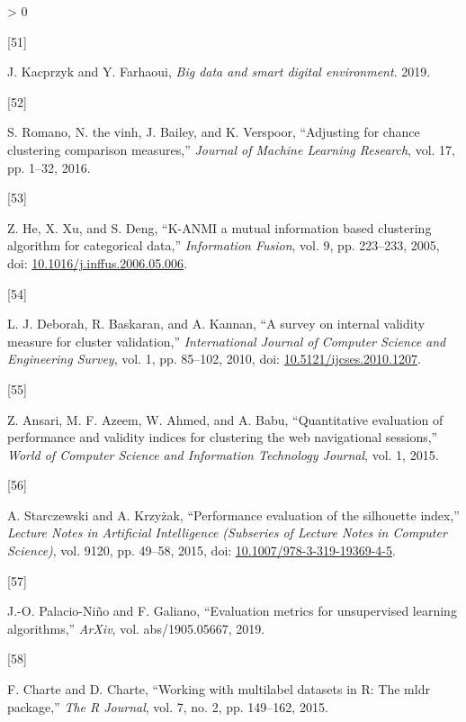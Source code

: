 \documentclass[
]{article}
\newlength{\cslhangindent}
\newlength{\csllabelwidth}
\newenvironment{CSLReferences}[3] %
 {%
  \setlength{\parindent}{0pt}
  \ifodd #1 \everypar{\setlength{\hangindent}{\cslhangindent}}\ignorespaces\fi
  \ifnum #2 > 0
  \setlength{\parskip}{#2\baselineskip}
  \fi
 }%
 {}
\newcommand{\CSLLeftMargin}[1]{\parbox[t]{\csllabelwidth}{#1}}
\newcommand{\CSLRightInline}[1]{\parbox[t]{\linewidth - \csllabelwidth}{#1}}
\begin{document}
\begin{CSLReferences}{0}{0}
\leavevmode\hypertarget{ref-Rjanuszyousef2019}{}%
\CSLLeftMargin{{[}51{]} }
\CSLRightInline{J. Kacprzyk and Y. Farhaoui, \emph{Big data and smart
digital environment}. 2019.}

\leavevmode\hypertarget{ref-Rsimonenguyenjameskarin2016}{}%
\CSLLeftMargin{{[}52{]} }
\CSLRightInline{S. Romano, N. the vinh, J. Bailey, and K. Verspoor,
{``Adjusting for chance clustering comparison measures,''} \emph{Journal
of Machine Learning Research}, vol. 17, pp. 1--32, 2016.}

\leavevmode\hypertarget{ref-Rzengyouxiaofeishengchun2005}{}%
\CSLLeftMargin{{[}53{]} }
\CSLRightInline{Z. He, X. Xu, and S. Deng, {``K-ANMI{} a mutual
information based clustering algorithm for categorical data,''}
\emph{Information Fusion}, vol. 9, pp. 223--233, 2005, doi:
\href{https://doi.org/10.1016/j.inffus.2006.05.006}{10.1016/j.inffus.2006.05.006}.}

\leavevmode\hypertarget{ref-Rdeborahbaskarankannan2010}{}%
\CSLLeftMargin{{[}54{]} }
\CSLRightInline{L. J. Deborah, R. Baskaran, and A. Kannan, {``A survey
on internal validity measure for cluster validation,''}
\emph{International Journal of Computer Science and Engineering Survey},
vol. 1, pp. 85--102, 2010, doi:
\href{https://doi.org/10.5121/ijcses.2010.1207}{10.5121/ijcses.2010.1207}.}

\leavevmode\hypertarget{ref-Rzahidmfwaseema2015}{}%
\CSLLeftMargin{{[}55{]} }
\CSLRightInline{Z. Ansari, M. F. Azeem, W. Ahmed, and A. Babu,
{``Quantitative evaluation of performance and validity indices for
clustering the web navigational sessions,''} \emph{World of Computer
Science and Information Technology Journal}, vol. 1, 2015.}

\leavevmode\hypertarget{ref-Rarturadam2015}{}%
\CSLLeftMargin{{[}56{]} }
\CSLRightInline{A. Starczewski and A. Krzyżak, {``Performance evaluation
of the silhouette index,''} \emph{Lecture Notes in Artificial
Intelligence (Subseries of Lecture Notes in Computer Science)}, vol.
9120, pp. 49--58, 2015, doi:
\href{https://doi.org/10.1007/978-3-319-19369-4-5}{10.1007/978-3-319-19369-4-5}.}

\leavevmode\hypertarget{ref-Rpalaciogaliano2019}{}%
\CSLLeftMargin{{[}57{]} }
\CSLRightInline{J.-O. Palacio-Niño and F. Galiano, {``Evaluation metrics
for unsupervised learning algorithms,''} \emph{ArXiv}, vol.
abs/1905.05667, 2019.}

\leavevmode\hypertarget{ref-Rchartedavid2015}{}%
\CSLLeftMargin{{[}58{]} }
\CSLRightInline{F. Charte and D. Charte, {``Working with multilabel
datasets in {R}: The mldr package,''} \emph{The R Journal}, vol. 7, no.
2, pp. 149--162, 2015.}

\end{CSLReferences}
\end{document}
